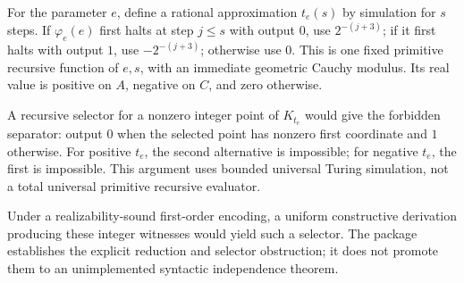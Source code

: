 For the parameter \(e\), define a rational approximation
\(t_e(s)\) by simulation for \(s\) steps. If
\(\varphi_e(e)\) first halts at step \(j\leq s\) with
output \(0\), use \(2^{-(j+3)}\); if it first halts
with output \(1\), use \(-2^{-(j+3)}\); otherwise use
\(0\). This is one fixed primitive recursive function
of \(e,s\), with an immediate geometric Cauchy modulus.
Its real value is positive on \(A\), negative on \(C\),
and zero otherwise.

A recursive selector for a nonzero integer point of
\(K_{t_e}\) would give the forbidden separator:
output \(0\) when the selected point has nonzero first
coordinate and \(1\) otherwise. For positive \(t_e\),
the second alternative is impossible; for negative
\(t_e\), the first is impossible.
This argument uses bounded universal Turing simulation,
not a total universal primitive recursive evaluator.

Under a realizability-sound first-order encoding, a
uniform constructive derivation producing these integer
witnesses would yield such a selector.
The package establishes the explicit reduction and
selector obstruction; it does not promote them to
an unimplemented syntactic independence theorem.

